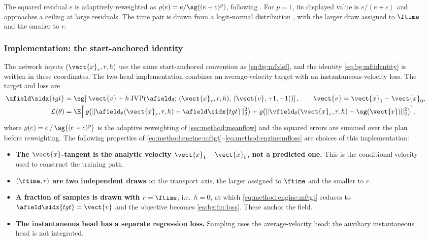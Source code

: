 The squared residual $e$ is adaptively reweighted as
$\varrho(e)=e/\sg((e+c)^{p})$, following \parencite[Sec.~4.3]{geng2025meanflow}.
For $p=1$, its displayed value is $e/(e+c)$ and approaches a ceiling at large residuals.
The time pair is drawn from a logit-normal distribution \parencite{esser2024scaling}, with the
larger draw assigned to $\ftime$ and the smaller to $r$.

\subsubsection*{Implementation: the start-anchored identity}

The network inputs $(\vect{x}_{r},r,h)$ use the same start-anchored convention as
\eqref{eq:bg:mf:def}, and the identity \eqref{eq:bg:mf:identity} is written in these coordinates.
The two-head implementation combines an average-velocity target with an instantaneous-velocity
loss. The target and loss are
\begin{align}
  \afield\sidx{tgt}
    &= \sg\!\left[\;\vect{v} + h\,
       \mathrm{JVP}\!\left(\afield_{\theta};\,
         (\vect{x}_{r},r,h),\,(\vect{v},+1,-1)\right)\right],
       \qquad \vect{v} = \vect{x}_{1}-\vect{x}_{0},
       \label{eq:method:engine:mftgt}\\
  \mathcal{L}(\theta)
    &= \E\Big[\,
        \varrho\big(\|\afield_{\theta}(\vect{x}_{r},r,h) - \afield\sidx{tgt}\|_{2}^{2}\big)
      + \varrho\big(\|\vfield_{\theta}(\vect{x}_{r},r,h) - \sg(\vect{v})\|_{2}^{2}\big)\Big],
       \label{eq:method:engine:mfloss}
\end{align}
where $\varrho(e) = e\,/\,\sg\big((e+c)^{p}\big)$ is the adaptive reweighting of
\autoref{sec:method:meanflow} and the squared errors are summed over the plan before reweighting.
The following properties of \eqref{eq:method:engine:mftgt}--\eqref{eq:method:engine:mfloss} are choices of
this implementation:

\begin{itemize}
  \item \textbf{The $\vect{x}$-tangent is the analytic velocity $\vect{x}_{1}-\vect{x}_{0}$, not a
    predicted one.} This is the conditional velocity used to construct the training path.
  \item \textbf{$(\ftime,r)$ are two independent draws} on the transport axis, the larger
    assigned to $\ftime$ and the smaller to $r$.
  \item \textbf{A fraction of samples is drawn with $r = \ftime$}, i.e.\ $h=0$, at which
    \eqref{eq:method:engine:mftgt} reduces to $\afield\sidx{tgt} = \vect{v}$ and the objective
    becomes \eqref{eq:bg:fm:loss}. These anchor the field.
  \item \textbf{The instantaneous head has a separate regression loss.} Sampling uses the
    average-velocity head; the auxiliary instantaneous head is not integrated.
\end{itemize}

